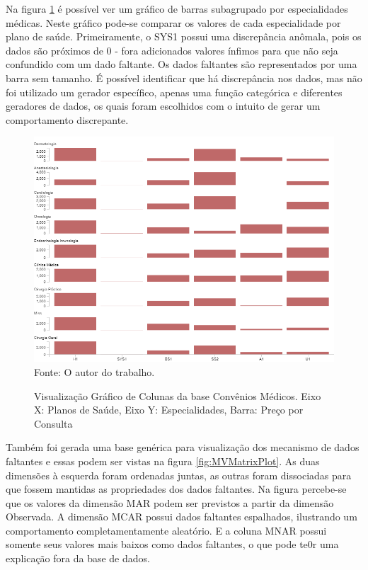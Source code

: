 \documentclass[
	12pt,				%
	openright,			%
	oneside,			%
	a4paper,			%
	english,			%
	brazil				%
	]{abntex2}
\begin{document}
	Na figura \ref{fig:BCCM} é possível ver um gráfico de barras subagrupado por especialidades médicas.
	Neste gráfico pode-se comparar os valores de cada especialidade por plano de saúde.
	Primeiramente, o SYS1 possui uma discrepância anômala, pois os dados são próximos de 0 - fora adicionados valores ínfimos para que não seja confundido com um dado faltante.
	Os dados faltantes são representados por uma barra sem tamanho.
	É possível identificar que há discrepância nos dados, mas não foi utilizado um gerador específico, apenas uma função categórica e diferentes geradores de dados, os quais foram escolhidos com o intuito de gerar um comportamento discrepante.

	\begin{figure}[h!]
		\centering
		\caption{Visualização Gráfico de Colunas da base Convênios Médicos. Eixo X: Planos de Saúde, Eixo Y: Especialidades, Barra: Preço por Consulta}
		\includegraphics[width=\linewidth]{./figures/Resultados/BCCM.png}
		\label{fig:BCCM}
		\footnotesize Fonte: O autor do trabalho.
	\end{figure}

	Também foi gerada uma base genérica para visualização dos mecanismo de dados faltantes e essas podem ser vistas na figura \ref{fig:MVMatrixPlot}.
	As duas dimensões à esquerda foram ordenadas juntas, as outras foram dissociadas para que fossem mantidas as propriedades dos dados faltantes.
	Na figura percebe-se que os valores da dimensão MAR podem ser previstos a partir da dimensão Observada.
	A dimensão MCAR possui dados faltantes espalhados, ilustrando um comportamento completamentamente aleatório.
	E a coluna MNAR possui somente seus valores mais baixos como dados faltantes, o que pode te0r uma explicação fora da base de dados.
	
\end{document}
